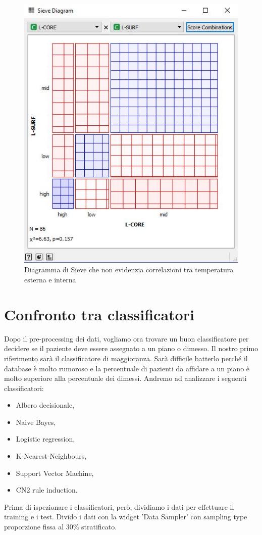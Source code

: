 \documentclass[a4paper, 12p]{report}
\begin{document}
\begin{figure}	
	\centering
	\includegraphics[scale = 0.6]{img/Sieve.JPG}
	\caption{Diagramma di Sieve che non evidenzia correlazioni tra temperatura esterna e interna }\label{fig:5}
\end{figure}
\chapter{Confronto tra classificatori}
Dopo il pre-processing dei dati, vogliamo ora trovare un buon classificatore per decidere se il paziente deve essere assegnato a un piano o dimesso. Il nostro primo riferimento sarà il classificatore di maggioranza. Sarà difficile batterlo perché il database è molto rumoroso e la percentuale di pazienti da affidare a un piano è molto superiore alla percentuale dei dimessi.
Andremo ad analizzare i seguenti classificatori:
\begin{itemize}
	\item Albero decisionale,
	\item Naive Bayes,
	\item Logistic regression,
	 \item K-Nearest-Neighbours,
		\item Support Vector Machine,
			\item CN2 rule induction.
	\end{itemize}		
	Prima di ispezionare i classificatori, però, dividiamo i dati per effettuare il training e i test. Divido i dati con la widget 'Data Sampler' con sampling type proporzione fissa al 30\% stratificato. 
	
\end{document}
